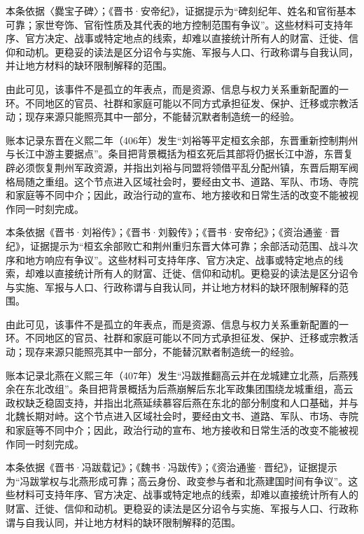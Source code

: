 本条依据〈爨宝子碑〉；《晋书·安帝纪》，证据提示为“碑刻纪年、姓名和官衔基本可靠；家世夸饰、官衔性质及其代表的地方控制范围有争议”。这些材料可支持年序、官方决定、战事或特定地点的线索，却难以直接统计所有人的财富、迁徙、信仰和动机。更稳妥的读法是区分诏令与实施、军报与人口、行政称谓与自我认同，并让地方材料的缺环限制解释的范围。

由此可见，该事件不是孤立的年表点，而是资源、信息与权力关系重新配置的一环。不同地区的官员、社群和家庭可能以不同方式承担征发、保护、迁移或宗教活动；现存来源只能照亮其中一部分，不能替沉默者制造统一的经验。

账本记录东晋在义熙二年（406年）发生“刘裕等平定桓玄余部，东晋重新控制荆州与长江中游主要据点”。条目把背景概括为桓玄死后其部将仍据长江中游，东晋复辟必须恢复荆州军政资源，并指出刘裕与同盟将领借平乱分配州镇，东晋后期军阀格局随之重组。这个节点进入区域社会时，要经由文书、道路、军队、市场、寺院和家庭等不同中介；因此，政治行动的宣布、地方接收和日常生活的改变不能被视作同一时刻完成。

本条依据《晋书·刘裕传》；《晋书·刘毅传》；《晋书·安帝纪》；《资治通鉴·晋纪》，证据提示为“桓玄余部败亡和荆州重归东晋大体可靠；余部活动范围、战斗次序和地方响应有争议”。这些材料可支持年序、官方决定、战事或特定地点的线索，却难以直接统计所有人的财富、迁徙、信仰和动机。更稳妥的读法是区分诏令与实施、军报与人口、行政称谓与自我认同，并让地方材料的缺环限制解释的范围。

由此可见，该事件不是孤立的年表点，而是资源、信息与权力关系重新配置的一环。不同地区的官员、社群和家庭可能以不同方式承担征发、保护、迁移或宗教活动；现存来源只能照亮其中一部分，不能替沉默者制造统一的经验。

账本记录北燕在义熙三年（407年）发生“冯跋推翻高云并在龙城建立北燕，后燕残余在东北改组”。条目把背景概括为后燕崩解后东北军政集团围绕龙城重组，高云政权缺乏稳固支持，并指出北燕延续慕容后燕在东北的部分制度和人口基础，并与北魏长期对峙。这个节点进入区域社会时，要经由文书、道路、军队、市场、寺院和家庭等不同中介；因此，政治行动的宣布、地方接收和日常生活的改变不能被视作同一时刻完成。

本条依据《晋书·冯跋载记》；《魏书·冯跋传》；《资治通鉴·晋纪》，证据提示为“冯跋掌权与北燕形成可靠；高云身份、政变参与者和北燕建国时间有争议”。这些材料可支持年序、官方决定、战事或特定地点的线索，却难以直接统计所有人的财富、迁徙、信仰和动机。更稳妥的读法是区分诏令与实施、军报与人口、行政称谓与自我认同，并让地方材料的缺环限制解释的范围。


